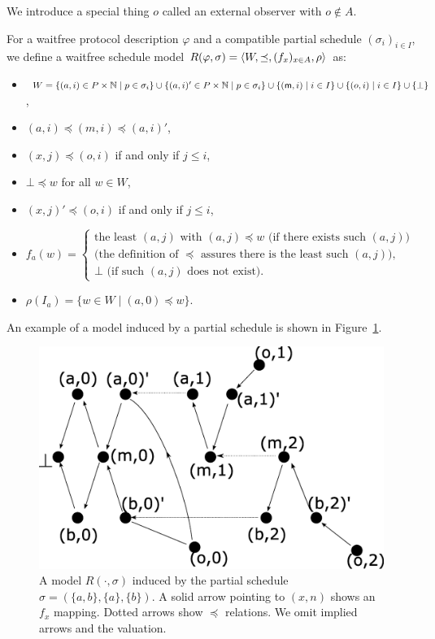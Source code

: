   We introduce a special thing $o$ called an external observer with $o \notin A$.
  \begin{definition}
   For a waitfree protocol description $\varphi$ and
   a compatible partial schedule $(\sigma_i)_{i\in I}$, we define
   a waitfree schedule model $R(\varphi, \sigma) = \langle{W, \preceq, (f_x)_{x\in A}, \rho}\rangle$ as:
   \begin{itemize}
    \item $
	  W = \{(a,i) \in P\times \mathbb N \mid p\in \sigma_i\} \cup
	  \{(a,i)' \in P\times \mathbb N \mid p\in \sigma_i\}
	  \cup \{({\sf m},i)\mid i\in I\} \cup \{(o,i) \mid i\in I\}\cup
	  \{\bot\}
	  $,
    \item $(a,i) \preceq (m, i)\preceq (a, i)'$,
    \item $(x,j)\preceq (o,i)$ if and only if $j\le i$,
    \item $\bot\preceq w$ for all $w \in W$,
    \item $(x,j)'\preceq (o,i)$ if and only if $j \le i$,
    \item
	 $
	 f_a(w) =
	 \left\{
	 \begin{array}{l}
	  \mbox{the least $(a,j)$ with $(a,j)\preceq w$ (if there exists such $(a,j)$)} \\
	  \mbox{(the definition of $\preceq$ assures there is the least such $(a,j)$)},\\
	  \mbox{$\bot$ (if such $(a,j)$ does not exist)}.
	 \end{array}
	 \right.
	 $
    \item $\rho(I_a) = \{w\in W\mid (a,0)\preceq w\}$.
   \end{itemize}
  \end{definition}

  An example of a model induced by a partial schedule is shown in
  Figure~\ref{schedulemodel}.
  \begin{figure}
   \begin{center}
    \includegraphics[scale=0.3]{schedulemodel.eps}
   \end{center}
   \caption[A model $R(\cdot, \sigma)$.]{A model $R(\cdot, \sigma)$
   induced by the partial schedule $\sigma = \left(\{a,b\}, \{a\}, \{b\}\right)$.
   A solid arrow pointing to $(x,n)$ shows an $f_x$ mapping.  Dotted arrows show $\preceq$ relations.
   We omit implied arrows and the valuation.}
   \label{schedulemodel}
  \end{figure}

